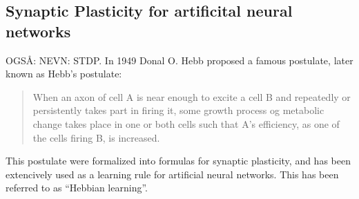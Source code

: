 




\subsection{Synaptic Plasticity for artificital neural networks}


OGSÅ: NEVN: STDP.
In 1949 Donal O. Hebb proposed a famous postulate, later known as Hebb's postulate:
\begin{quote}
When an axon of cell A is near enough to excite a cell B and repeatedly or persistently takes part in firing it, some growth process og metabolic change takes place in one or both cells such that A's efficiency, as one of the cells firing B, is increased.\cite{Hebb1949Kap4}
\end{quote}

This postulate were formalized into formulas for synaptic plasticity, and has been extencively used as a learning rule for artificial neural networks.
This has been referred to as ``Hebbian learning''\cite{HaykinANNbok}.


